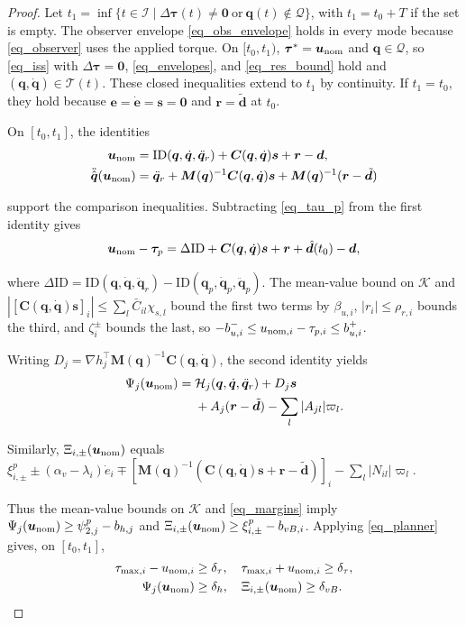\begin{proof}
Let $t_1=\inf\{t\in\mathcal I\mid\Delta\bm\tau(t)\ne\bm0\ \text{or}\ \bm q(t)\notin\mathcal Q\}$, with $t_1=t_0+T$ if the set is empty. The observer envelope \eqref{eq_obs_envelope} holds in every mode because \eqref{eq_observer} uses the applied torque. On $[t_0,t_1)$, $\bm\tau^*=\bm u_{\rm nom}$ and $\bm q\in\mathcal Q$, so \eqref{eq_iss} with $\Delta\bm\tau=\bm0$, \eqref{eq_envelopes}, and \eqref{eq_res_bound} hold and $(\bm q,\dot{\bm q})\in\mathcal T(t)$. These closed inequalities extend to $t_1$ by continuity. If $t_1=t_0$, they hold because $\bm e=\dot{\bm e}=\bm s=\bm0$ and $\bm r=\tilde{\bm d}$ at $t_0$.

On $[t_0,t_1]$, the identities
\[
\begin{aligned}
\bm u_{\rm nom}&=\mathrm{ID}(\bm q,\dot{\bm q},\ddot{\bm q}_r)
+\bm C(\bm q,\dot{\bm q})\bm s+\bm r-\bm d,\\
\ddot{\hat{\bm q}}(\bm u_{\rm nom})&=\ddot{\bm q}_r
+\bm M(\bm q)^{-1}\bm C(\bm q,\dot{\bm q})\bm s+\bm M(\bm q)^{-1}(\bm r-\tilde{\bm d})
\end{aligned}
\]

support the comparison inequalities. Subtracting \eqref{eq_tau_p} from the first identity gives
\[
\bm u_{\rm nom}-\bm\tau_p=\Delta\mathrm{ID}+\bm C(\bm q,\dot{\bm q})\bm s+\bm r+\hat{\bm d}(t_0)-\bm d,
\]

where $\Delta\mathrm{ID}=\mathrm{ID}(\bm q,\dot{\bm q},\ddot{\bm q}_r)-\mathrm{ID}(\bm q_p,\dot{\bm q}_p,\ddot{\bm q}_p)$. The mean-value bound on $\mathcal K$ and $|[\bm C(\bm q,\dot{\bm q})\bm s]_i|\le\sum_l\bar C_{il}\chi_{s,l}$ bound the first two terms by $\beta_{u,i}$, $|r_i|\le\rho_{r,i}$ bounds the third, and $\zeta_i^\pm$ bounds the last, so $-b_{u,i}^-\le u_{{\rm nom},i}-\tau_{p,i}\le b_{u,i}^+$.

Writing $D_j=\nabla h_j^\top\bm M(\bm q)^{-1}\bm C(\bm q,\dot{\bm q})$, the second identity yields
\[
\begin{aligned}
\Psi_j(\bm u_{\rm nom})={}&
\mathcal H_j(\bm q,\dot{\bm q},\ddot{\bm q}_r)
+D_j\bm s\\
&+A_j(\bm r-\tilde{\bm d})
-\sum_l|A_{jl}|\varpi_l.
\end{aligned}
\]

Similarly, $\Xi_{i,\pm}(\bm u_{\rm nom})$ equals $\xi^p_{i,\pm}\pm(\alpha_v-\lambda_i)\dot e_i\mp[\bm M(\bm q)^{-1}(\bm C(\bm q,\dot{\bm q})\bm s+\bm r-\tilde{\bm d})]_i-\sum_l|N_{il}|\varpi_l$.

Thus the mean-value bounds on $\mathcal K$ and \eqref{eq_margins} imply
$\Psi_j(\bm u_{\rm nom})\ge\psi^p_{2,j}-b_{h,j}$ and
$\Xi_{i,\pm}(\bm u_{\rm nom})\ge\xi^p_{i,\pm}-b_{vB,i}$.
Applying \eqref{eq_planner} gives, on $[t_0,t_1]$,
\[
\begin{aligned}
\tau_{\max,i}-u_{{\rm nom},i}&\ge\delta_\tau,\quad
\tau_{\max,i}+u_{{\rm nom},i}\ge\delta_\tau,\\
\Psi_j(\bm u_{\rm nom})&\ge\delta_h,\quad
\Xi_{i,\pm}(\bm u_{\rm nom})\ge\delta_{vB}.
\end{aligned}
\]


\end{proof}
